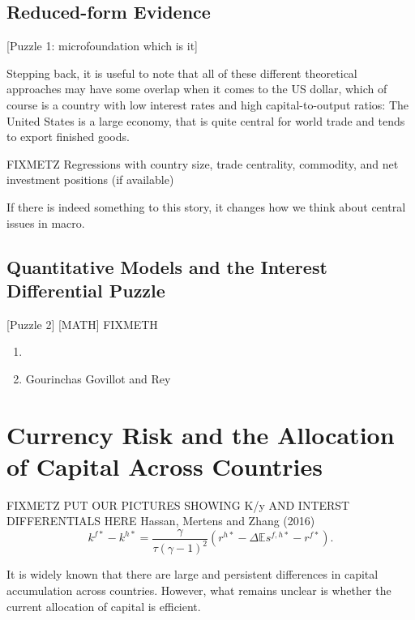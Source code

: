 \documentclass{ar-1col}
\begin{document}
\subsection{Reduced-form Evidence}

[Puzzle 1: microfoundation which is it]

Stepping back, it is useful to note that all of these different theoretical approaches may have some overlap when it comes to the US dollar, which of course is a country with low interest rates and high capital-to-output ratios: The United States is a large economy, that is quite central for world trade and tends to export finished goods.



FIXMETZ Regressions with country size, trade centrality, commodity, and net investment positions (if available)



If there is indeed something to this story, it changes how we think
about central issues in macro.



\subsection{Quantitative Models and the Interest Differential Puzzle}

[Puzzle 2] [MATH]
FIXMETH

\begin{enumerate}
\item \citet{ColacitoCroceHoHoward2018}
\item  Gourinchas Govillot and Rey
\end{enumerate}


\section{Currency Risk and the Allocation of Capital Across Countries}

FIXMETZ PUT OUR PICTURES SHOWING K/y AND INTERST DIFFERENTIALS HERE
 \citet{DavidHenriksenSimonovska2014}
Hassan, Mertens and Zhang (2016)
\begin{equation}\label{eq_link_k_r}
  k^{f\ast}-k^{h\ast} = \frac{\gamma}{\tau(\gamma-1)^2}\left(r^{h \ast} - \Delta \mathbb{E} s^{f, h \ast} - r^{f \ast}\right).
\end{equation}

It is widely known that there are large and persistent differences in capital 
accumulation across countries. However, what remains unclear is whether the 
current allocation of capital is efficient.
\end{document}
